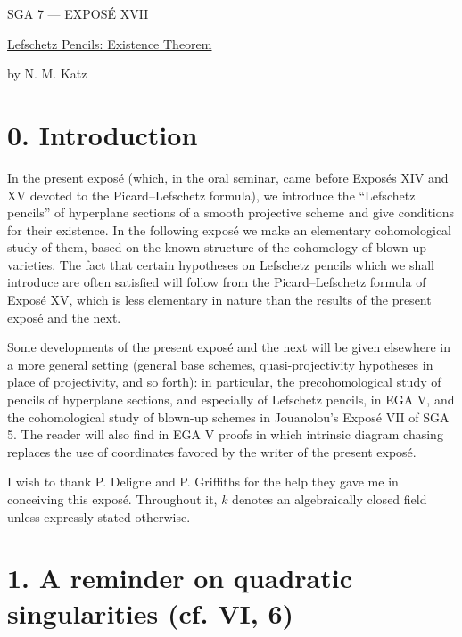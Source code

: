 \clearpage
\begin{center}
{\large SGA 7 --- EXPOS\'E XVII}\par
\vspace{2em}
{\Large\underline{Lefschetz Pencils: Existence Theorem}}\par
\vspace{1.5em}
{\large by N. M. Katz}
\end{center}

\section*{0. Introduction}

In the present expos\'e (which, in the oral seminar, came before
Expos\'es XIV and XV devoted to the Picard--Lefschetz formula), we
introduce the ``Lefschetz pencils'' of hyperplane sections of a smooth
projective scheme and give conditions for their existence.  In the
following expos\'e we make an elementary cohomological study of them,
based on the known structure of the cohomology of blown-up varieties.
The fact that certain hypotheses on Lefschetz pencils which we shall
introduce are often satisfied will follow from the Picard--Lefschetz
formula of Expos\'e XV, which is less elementary in nature than the
results of the present expos\'e and the next.

Some developments of the present expos\'e and the next will be given
elsewhere in a more general setting (general base schemes,
quasi-projectivity hypotheses in place of projectivity, and so forth):
in particular, the precohomological study of pencils of hyperplane
sections, and especially of Lefschetz pencils, in EGA V, and the
cohomological study of blown-up schemes in Jouanolou's Expos\'e VII of
SGA 5.  The reader will also find in EGA V proofs in which intrinsic
diagram chasing replaces the use of coordinates favored by the writer
of the present expos\'e.

I wish to thank P. Deligne and P. Griffiths for the help they gave me
in conceiving this expos\'e.  Throughout it, $k$ denotes an
algebraically closed field unless expressly stated otherwise.

\section*{1. A reminder on quadratic singularities (cf. VI, 6)}

